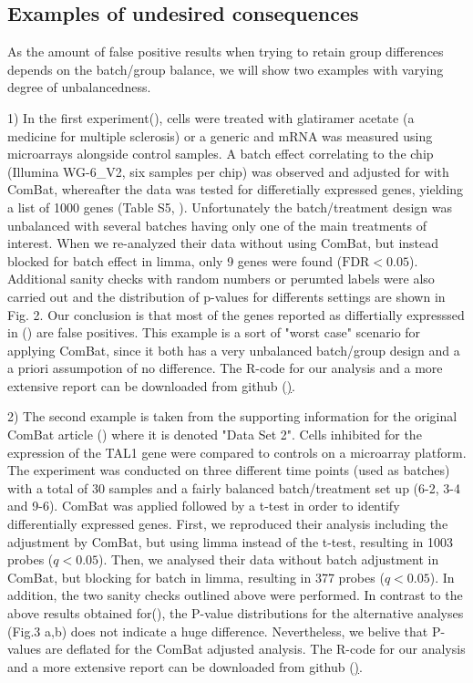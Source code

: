 \documentclass{bio}
\begin{document}
\subsection{Examples of undesired consequences}

As the amount of false positive results when trying to retain group differences depends on the batch/group balance, we will show two examples with varying degree of unbalancedness. 

1) In the first experiment(\citealp{Towfic2014}), cells were treated with glatiramer acetate (a medicine for multiple sclerosis) or a generic and mRNA was measured using microarrays alongside control samples. A batch effect correlating to the chip (Illumina WG-6\_V2, six samples per chip) was observed and adjusted for with ComBat, whereafter the data was tested for differetially expressed genes, yielding a list of 1000 genes (Table S5, \citealp{Towfic2014}). Unfortunately the batch/treatment design was unbalanced with several batches having only one of the main treatments of interest. When we re-analyzed their data without using ComBat, but instead blocked for batch effect in limma, only 9 genes were found ($\text{FDR}<0.05$). Additional sanity checks with random numbers or perumted labels were also carried out and the distribution of p-values for differents settings are shown in Fig. 2.  Our conclusion is that most of the genes reported as differtially expresssed in (\citealp{Towfic2014}) are false positives. This example is a sort of "worst case" scenario for applying ComBat, since it both has a very unbalanced batch/group design and a a priori assumpotion of no difference. The R-code for our analysis and a more extensive report can be downloaded from github (\href{https://github.com/vegardny/combat_tests.git}).


2) The second example is taken from the supporting information for the original ComBat article (\citealp{Johnson2007}) where it is denoted "Data Set 2". Cells inhibited for the expression of the TAL1 gene were compared to controls on a microarray platform. The experiment was conducted on three different time points (used as batches) with a total of 30 samples and a fairly balanced batch/treatment set up (6-2, 3-4 and 9-6). ComBat was applied followed by a t-test in order to identify differentially expressed genes. First, we reproduced their analysis including the adjustment by ComBat, but using limma instead of the t-test, resulting in 1003 probes ($q<0.05$).  Then, we analysed their data without batch adjustment in ComBat, but blocking for batch in limma, resulting in 377 probes ($q<0.05$). In addition, the two sanity checks outlined above were performed. In contrast to the above results obtained for(\citealp{Towfic2014}), the P-value distributions for the alternative analyses (Fig.3 a,b) does not indicate a huge difference. Nevertheless, we belive that  P-values are deflated for the ComBat adjusted analysis. The R-code for our analysis and a more extensive report can be downloaded from github (\href{https://github.com/vegardny/combat_tests.git}).
\end{document}
